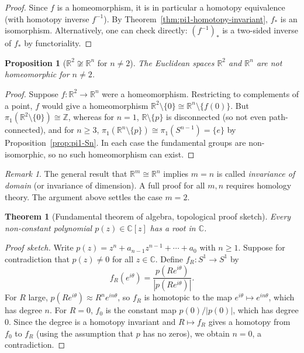 \documentclass[12pt,a4paper,openany]{book}
\theoremstyle{definition}
\theoremstyle{plain}
\newtheorem{theorem}[definition]{Theorem}
\newtheorem{proposition}[definition]{Proposition}
\theoremstyle{remark}
\newtheorem{remark}[definition]{Remark}
\newcommand{\Z}{\mathbb{Z}}
\newcommand{\R}{\mathbb{R}}
\newcommand{\C}{\mathbb{C}}
\newcommand{\abs}[1]{\left|#1\right|}
\begin{document}
\begin{proof}
Since $f$ is a homeomorphism, it is in particular a homotopy equivalence (with
homotopy inverse $f^{-1}$). By Theorem~\ref{thm:pi1-homotopy-invariant}, $f_*$
is an isomorphism. Alternatively, one can check directly: $(f^{-1})_*$ is a
two-sided inverse of $f_*$ by functoriality.
\end{proof}

\begin{proposition}[$\R^2 \not\cong \R^n$ for $n \ne 2$]\label{prop:R2-not-Rn}
The Euclidean spaces $\R^2$ and $\R^n$ are not homeomorphic for $n \ne 2$.
\end{proposition}

\begin{proof}
Suppose $f \colon \R^2 \to \R^n$ were a homeomorphism. Restricting to
complements of a point, $f$ would give a homeomorphism $\R^2 \setminus \{0\}
\cong \R^n \setminus \{f(0)\}$. But $\pi_1(\R^2 \setminus \{0\}) \cong \Z$,
whereas for $n = 1$, $\R \setminus \{p\}$ is disconnected (so not even
path-connected), and for $n \ge 3$, $\pi_1(\R^n \setminus \{p\}) \cong
\pi_1(S^{n-1}) = \{e\}$ by Proposition~\ref{prop:pi1-Sn}. In each case the
fundamental groups are non-isomorphic, so no such homeomorphism can exist.
\end{proof}

\begin{remark}\label{rem:invariance-of-domain}
The general result that $\R^m \cong \R^n$ implies $m = n$ is called
\emph{invariance of domain} (or invariance of
dimension). A full proof for all $m, n$ requires homology theory. The argument
above settles the case $m = 2$.
\end{remark}

\begin{theorem}[Fundamental theorem of algebra, topological proof sketch]\label{thm:FTA-sketch}
Every non-constant polynomial $p(z) \in \C[z]$ has a root in $\C$.
\end{theorem}

\begin{proof}[Proof sketch]
Write $p(z) = z^n + a_{n-1}z^{n-1} + \cdots + a_0$ with $n \ge 1$. Suppose for
contradiction that $p(z) \ne 0$ for all $z \in \C$. Define $f_R \colon S^1 \to
S^1$ by
\[
  f_R(e^{i\theta}) = \frac{p(Re^{i\theta})}{\abs{p(Re^{i\theta})}}.
\]
For $R$ large, $p(Re^{i\theta}) \approx R^n e^{in\theta}$, so $f_R$ is
homotopic to the map $e^{i\theta} \mapsto e^{in\theta}$, which has degree $n$.
For $R = 0$, $f_0$ is the constant map $p(0)/\abs{p(0)}$, which has degree $0$.
Since the degree is a homotopy invariant and $R \mapsto f_R$ gives a homotopy
from $f_0$ to $f_R$ (using the assumption that $p$ has no zeros), we obtain $n
= 0$, a contradiction.
\end{proof}
\end{document}
